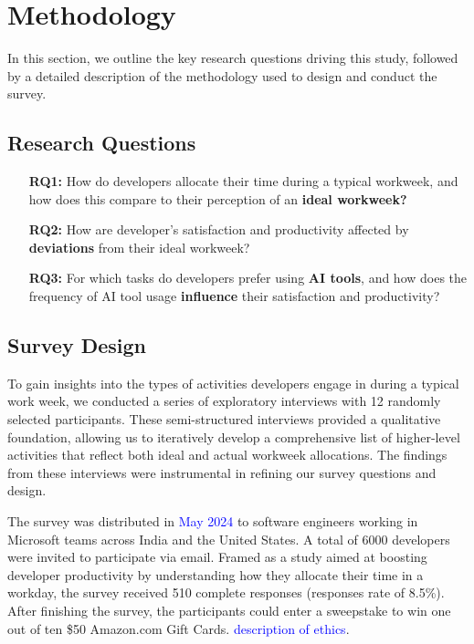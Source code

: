 \section{Methodology}
In this section, we outline the key research questions driving this study, followed by a detailed description of the methodology used to design and conduct the survey.
\subsection{Research Questions}
\begin{enumerate}
    \item[\textbf{RQ1:}] How do developers allocate their time during a typical workweek, and how does this compare to their perception of an \textbf{ideal workweek?}
    \item[\textbf{RQ2:}] How are developer's satisfaction and productivity affected by \textbf{deviations} from their ideal workweek?
     \item[\textbf{RQ3:}] For which tasks do developers prefer using \textbf{AI tools}, and how does the frequency of AI tool usage \textbf{influence} their satisfaction and productivity?
\end{enumerate}

\subsection{Survey Design}

To gain insights into the types of activities developers engage in during a typical work week, we conducted a series of exploratory interviews with 12 randomly selected participants. These semi-structured interviews provided a qualitative foundation, allowing us to iteratively develop a comprehensive list of higher-level activities that reflect both ideal and actual workweek allocations. The findings from these interviews were instrumental in refining our survey questions and design.


The survey was distributed in \textcolor{blue}{May 2024} to software engineers working in Microsoft teams across India and the United States. A total of 6000 developers were invited to participate via email. Framed as a study aimed at boosting developer productivity by understanding how they allocate their time in a workday, the survey received 510 complete responses (responses rate of 8.5\%). After finishing the survey, the participants could enter a sweepstake to win one out of ten \$50 Amazon.com Gift Cards.
\textcolor{blue}{description of ethics}.

